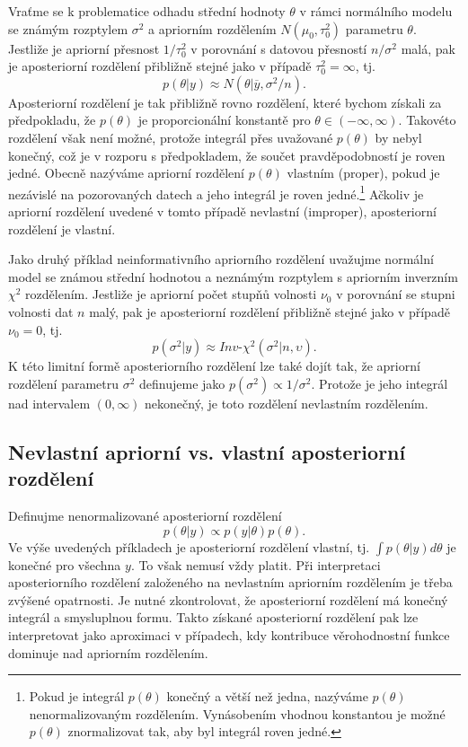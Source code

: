 Vraťme se k problematice odhadu střední hodnoty $\theta$ v rámci normálního modelu se známým rozptylem $\sigma^2$ a apriorním rozdělením $N(\mu_0, \tau_0^2)$ parametru $\theta$. Jestliže je apriorní přesnost $1 / \tau_0^2$ v porovnání s datovou přesností $n / \sigma^2$ malá, pak je aposteriorní rozdělení přibližně stejné jako v případě $\tau_0^2 = \infty$, tj.
\begin{equation}
p(\theta | y) \approx N(\theta | \overline{y}, \sigma^2 / n).
\end{equation}
Aposteriorní rozdělení je tak přibližně rovno rozdělení, které bychom získali za předpokladu, že $p(\theta)$ je proporcionální konstantě pro $\theta \in (-\infty, \infty)$. Takovéto rozdělení však není možné, protože integrál přes uvažované $p(\theta)$ by nebyl konečný, což je v rozporu s předpokladem, že součet pravděpodobností je roven jedné. Obecně nazýváme apriorní rozdělení $p(\theta)$ vlastním (proper), pokud je nezávislé na pozorovaných datech a jeho integrál je roven jedné.\footnote{Pokud je integrál $p(\theta)$ konečný a větší než jedna, nazýváme $p(\theta)$ nenormalizovaným rozdělením. Vynásobením vhodnou konstantou je možné $p(\theta)$ znormalizovat tak, aby byl integrál roven jedné.} Ačkoliv je apriorní rozdělení uvedené v tomto případě nevlastní (improper), aposteriorní rozdělení je vlastní.

Jako druhý příklad neinformativního apriorního rozdělení uvažujme normální model se známou střední hodnotou a neznámým rozptylem s apriorním inverzním $\chi^2$ rozdělením. Jestliže je apriorní počet stupňů volnosti $\nu_0$ v porovnání se stupni volnosti dat $n$ malý, pak je aposteriorní rozdělení přibližně stejné jako v případě $\nu_0 = 0$, tj.
\begin{equation}
p(\sigma^2 | y) \approx \textit{Inv-}\chi^2(\sigma^2 | n, \upsilon).
\end{equation}
K této limitní formě aposteriorního rozdělení lze také dojít tak, že apriorní rozdělení parametru $\sigma^2$ definujeme jako $p(\sigma^2) \varpropto 1 / \sigma^2$. Protože je jeho integrál nad intervalem $(0, \infty)$ nekonečný, je toto rozdělení nevlastním rozdělením.

\subsection{Nevlastní apriorní vs. vlastní aposteriorní rozdělení}

Definujme nenormalizované aposteriorní rozdělení
\begin{equation}
p(\theta | y) \varpropto p(y | \theta) p(\theta).
\end{equation}
Ve výše uvedených příkladech je aposteriorní rozdělení vlastní, tj. $\int p(\theta | y) d \theta$ je konečné pro všechna $y$. To však nemusí vždy platit. Při interpretaci aposteriorního rozdělení založeného na nevlastním apriorním rozdělením je třeba zvýšené opatrnosti. Je nutné zkontrolovat, že aposteriorní rozdělení má konečný integrál a smysluplnou formu. Takto získané aposteriorní rozdělení pak lze interpretovat jako aproximaci v případech, kdy kontribuce věrohodnostní funkce dominuje nad apriorním rozdělením.

